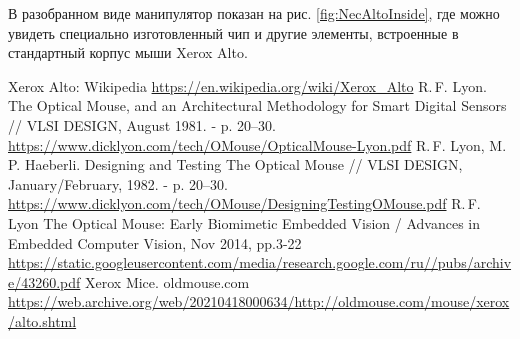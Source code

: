 \documentclass[11pt, a4paper]{article}
\begin{document}
В разобранном виде манипулятор показан на рис. \ref{fig:NecAltoInside}, где можно увидеть специально изготовленный чип \cite{vlsi82} и другие элементы, встроенные в стандартный корпус мыши Xerox Alto.
    
\begin{thebibliography}{9}
 Xerox Alto: Wikipedia \url{https://en.wikipedia.org/wiki/Xerox_Alto}
 R.\,F. Lyon. The Optical Mouse, and an Architectural Methodology for
Smart Digital Sensors // VLSI DESIGN, August 1981. - p. 20--30. \url{https://www.dicklyon.com/tech/OMouse/OpticalMouse-Lyon.pdf}
 R.\,F. Lyon, M.\,P. Haeberli. Designing and Testing The Optical Mouse // VLSI DESIGN, January/February, 1982. - p. 20--30. \url{https://www.dicklyon.com/tech/OMouse/DesigningTestingOMouse.pdf}
 R.\,F. Lyon The Optical Mouse: Early Biomimetic Embedded Vision / Advances in Embedded Computer Vision, Nov 2014, pp.3-22 \url{https://static.googleusercontent.com/media/research.google.com/ru//pubs/archive/43260.pdf}
 Xerox Mice. oldmouse.com \url{https://web.archive.org/web/20210418000634/http://oldmouse.com/mouse/xerox/alto.shtml}
\end{thebibliography}
\end{document}
